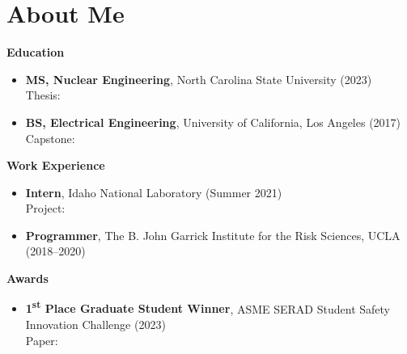 \section*{About Me}
\begin{frame}[t]
\textbf{Education}
\vspace{2pt}
{\smaller[1]
\begin{itemize}
\setlength{\baselineskip}{2pt}
    \item {
    \textbf{MS, Nuclear Engineering}, North Carolina State University (2023)\\
    {{\smaller[1.2]Thesis: \color{red600}{"Integrating Dual Error Propagation into Dynamic Event Trees to Support Fission Battery Probabilistic Risk Assessments"}}}
    }
    \vspace{4pt}
    \item {\textbf{BS, Electrical Engineering}, University of California, Los Angeles (2017)\\
    {{\smaller[1.2]Capstone: \color{red600}{"Integer Hardware Optimizations on TI-C6000 DSPs for Low-Power IoT Applications"}}}
    }
\end{itemize}
}
\vspace{8pt}
\textbf{Work Experience}
{\smaller[1]
\begin{itemize}
\setlength{\baselineskip}{2pt}
    \item{\textbf{Intern}, Idaho National Laboratory (Summer 2021)\\
        {{\smaller[1.2]Project: \color{red600}{Coupled OpenPRA's OpenEPL engine with EMRALD.}}}
    }
    \vspace{2pt}
    \item{\textbf{Programmer}, The B. John Garrick Institute for the Risk Sciences, UCLA (2018--2020)\\
    {{\smaller[1.2]\color{red600}{Developed the Hybrid Causal Logic and Phoenix human reliability assessment web applications.}}}
    }
\end{itemize}
}
\vspace{8pt}
\textbf{Awards}
{\smaller[1]
\begin{itemize}
    \item{\textbf{1\textsuperscript{st} Place Graduate Student Winner}, ASME SERAD Student Safety Innovation Challenge (2023)\\
    {{\smaller[1.2]Paper: \color{red600}{Introducing OpenPRA: A Web-Based Framework for Collaborative Probabilistic Risk Assessment}}}
    }
\end{itemize}
} 
\end{frame}